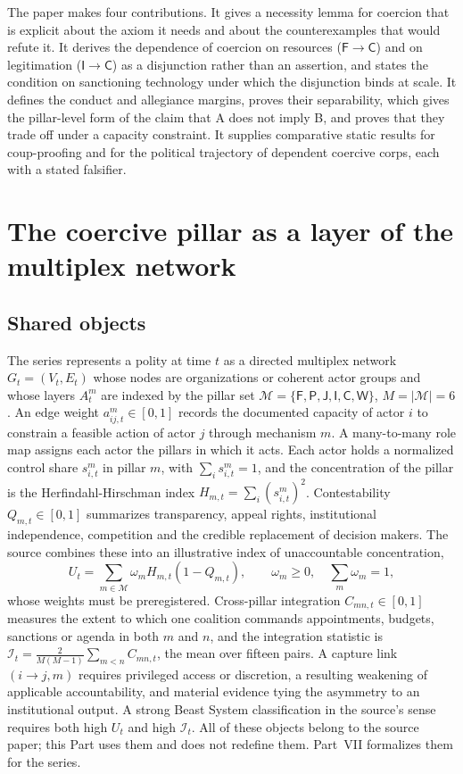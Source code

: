 \documentclass[11pt,letterpaper]{article}
\theoremstyle{definition}
\theoremstyle{remark}
\newcommand{\pF}{\mathsf{F}}
\newcommand{\pP}{\mathsf{P}}
\newcommand{\pJ}{\mathsf{J}}
\newcommand{\pI}{\mathsf{I}}
\newcommand{\pC}{\mathsf{C}}
\newcommand{\pW}{\mathsf{W}}
\newcommand{\Mset}{\mathcal{M}}
\newcommand{\Integ}{\mathcal{I}}
\begin{document}
The paper makes four contributions. It gives a necessity lemma for coercion that is explicit about the axiom it needs and about the counterexamples that would refute it. It derives the dependence of coercion on resources ($\pF \to \pC$) and on legitimation ($\pI \to \pC$) as a disjunction rather than an assertion, and states the condition on sanctioning technology under which the disjunction binds at scale. It defines the conduct and allegiance margins, proves their separability, which gives the pillar-level form of the claim that A does not imply B, and proves that they trade off under a capacity constraint. It supplies comparative static results for coup-proofing and for the political trajectory of dependent coercive corps, each with a stated falsifier.

\section{The coercive pillar as a layer of the multiplex network}
\label{sec:layer}

\subsection{Shared objects}

The series represents a polity at time $t$ as a directed multiplex network $G_t = (V_t, E_t)$ whose nodes are organizations or coherent actor groups and whose layers $A^m_t$ are indexed by the pillar set $\Mset = \{\pF, \pP, \pJ, \pI, \pC, \pW\}$, $M = |\Mset| = 6$ \citep{largo2026hbs}. An edge weight $a^m_{ij,t} \in [0,1]$ records the documented capacity of actor $i$ to constrain a feasible action of actor $j$ through mechanism $m$. A many-to-many role map assigns each actor the pillars in which it acts. Each actor holds a normalized control share $s^m_{i,t}$ in pillar $m$, with $\sum_i s^m_{i,t} = 1$, and the concentration of the pillar is the Herfindahl-Hirschman index $H_{m,t} = \sum_i (s^m_{i,t})^2$. Contestability $Q_{m,t} \in [0,1]$ summarizes transparency, appeal rights, institutional independence, competition and the credible replacement of decision makers. The source combines these into an illustrative index of unaccountable concentration,
\begin{equation}
U_t = \sum_{m \in \Mset} \omega_m H_{m,t}(1 - Q_{m,t}), \qquad \omega_m \ge 0, \quad \sum_m \omega_m = 1,
\label{eq:U}
\end{equation}
whose weights must be preregistered. Cross-pillar integration $C_{mn,t} \in [0,1]$ measures the extent to which one coalition commands appointments, budgets, sanctions or agenda in both $m$ and $n$, and the integration statistic is $\Integ_t = \frac{2}{M(M-1)} \sum_{m<n} C_{mn,t}$, the mean over fifteen pairs. A capture link $(i \to j, m)$ requires privileged access or discretion, a resulting weakening of applicable accountability, and material evidence tying the asymmetry to an institutional output. A strong Beast System classification in the source's sense requires both high $U_t$ and high $\Integ_t$. All of these objects belong to the source paper; this Part uses them and does not redefine them. Part~VII formalizes them for the series.
\end{document}

